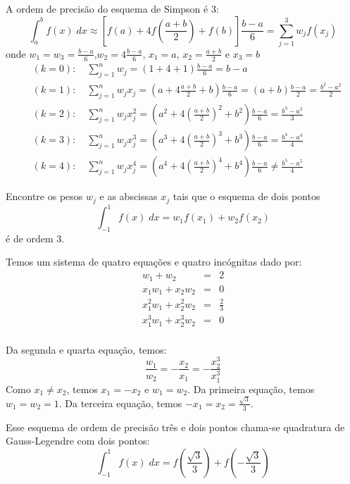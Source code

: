 \begin{ex}
A ordem de precisão do esquema de Simpson é 3:
$$\int_a^b f(x)\;dx \approx \left[f(a)+4f\left(\frac{a+b}{2}\right)+f(b)\right]\frac{b-a}{6}=\sum_{j=1}^3w_jf(x_j)$$
onde $w_1=w_3=\frac{b-a}{6}$,$w_2=4\frac{b-a}{6}$, $x_1=a$, $x_2=\frac{a+b}{2}$ e $x_3=b$
\begin{eqnarray*}
  &(k=0):\quad\sum_{j=1}^n w_j = (1+4+1)\frac{b-a}{6}=b-a\\
  &(k=1):\quad\sum_{j=1}^n w_jx_j = (a+4\frac{a+b}{2}+b)\frac{b-a}{6} = (a+b)\frac{b-a}{2} = \frac{b^2-a^2}{2}\\
  &(k=2):\quad\sum_{j=1}^n w_jx_j^2 = (a^2+4\left(\frac{a+b}{2}\right)^2+b^2)\frac{b-a}{6} = \frac{b^3-a^3}{3}\\
  &(k=3):\quad\sum_{j=1}^n w_jx_j^3 = (a^3+4\left(\frac{a+b}{2}\right)^3+b^3)\frac{b-a}{6}= \frac{b^4-a^4}{4}\\
  &(k=4):\quad\sum_{j=1}^n w_jx_j^4 = (a^4+4\left(\frac{a+b}{2}\right)^4+b^4)\frac{b-a}{6}\neq \frac{b^5-a^5}{4}
\end{eqnarray*}
\end{ex}

\begin{ex}
Encontre os pesos $w_j$ e as abscissas $x_j$ tais que o esquema de dois pontos
$$\int_{-1}^1 f(x)\;dx = w_1f(x_1)+w_2f(x_2)$$
é de ordem 3.
\end{ex}
\begin{sol}
  Temos um sistema de quatro equações e quatro incógnitas dado por:
\begin{eqnarray*}
w_1+w_2&=&2\\
x_1w_1+x_2w_2&=&0\\
x_1^2w_1+x_2^2w_2&=&\frac{2}{3}\\
x_1^3w_1+x_2^3w_2&=&0\\
\end{eqnarray*}

Da segunda e quarta equação, temos:
$$\frac{w_1}{w_2}=-\frac{x_2}{x_1}=-\frac{x_2^3}{x_1^3}$$
Como $x_1\neq x_2$, temos $x_1=-x_2$ e $w_1=w_2$. Da primeira equação, temos $w_1=w_2=1$. Da terceira equação, temos $-x_1=x_2=\frac{\sqrt{3}}{3}$.

Esse esquema de ordem de precisão três e dois pontos chama-se quadratura de Gauss-Legendre com dois pontos:
$$\int_{-1}^1 f(x)\;dx = f\left(\frac{\sqrt{3}}{3}\right)+f\left(-\frac{\sqrt{3}}{3}\right)$$
\end{sol}

